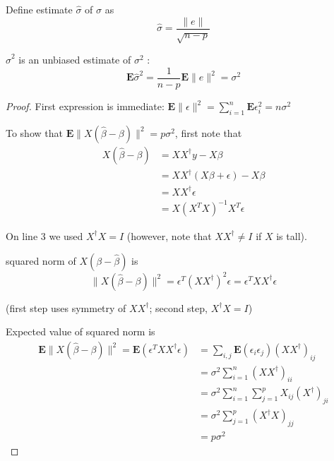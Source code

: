 \begin{definition}
    Define estimate $ \hat{\sigma} $ of $ \sigma $ as
\begin{equation}
\hat{\sigma}=\frac{\|e\|}{\sqrt{n-p}}
\end{equation}
\end{definition}

\begin{theorem}
    $ \hat{\sigma}^{2} $ is an unbiased estimate of $ \sigma^{2} $ :
\begin{equation}
\mathbf{E} \hat{\sigma}^{2}=\frac{1}{n-p} \mathbf{E}\|e\|^{2}=\sigma^{2}
\end{equation}
\end{theorem}


\begin{proof}
    First expression is immediate: $ \mathbf{E}\|\epsilon\|^{2}=\sum_{i=1}^{n} \mathbf{E} \epsilon_{i}^{2}=n \sigma^{2} $

    To show that $ \mathbf{E}\|X(\hat{\beta}-\beta)\|^{2}=p \sigma^{2} $, first note that
\begin{equation}
\begin{aligned}
X(\hat{\beta}-\beta) &=X X^{\dagger} y-X \beta \\
&=X X^{\dagger}(X \beta+\epsilon)-X \beta \\
&=X X^{\dagger} \epsilon \\
&=X\left(X^{T} X\right)^{-1} X^{T} \epsilon
\end{aligned}
\end{equation}

On line 3 we used $ X^{\dagger} X=I $ (however, note that $ X X^{\dagger} \neq I $ if $ X $ is tall).

\begin{theorem}
    squared norm of $ X(\beta-\hat{\beta}) $ is
\begin{equation}
\|X(\hat{\beta}-\beta)\|^{2}=\epsilon^{T}\left(X X^{\dagger}\right)^{2} \epsilon=\epsilon^{T} X X^{\dagger} \epsilon
\end{equation}

(first step uses symmetry of $ X X^{\dagger} $; second step, $ X^{\dagger} X=I $)
\end{theorem}



Expected value of squared norm is
\begin{equation}
\begin{aligned}
\mathbf{E}\|X(\hat{\beta}-\beta)\|^{2}=\mathbf{E}\left(\epsilon^{T} X X^{\dagger} \epsilon\right) &=\sum_{i, j} \mathbf{E}\left(\epsilon_{i} \epsilon_{j}\right)\left(X X^{\dagger}\right)_{i j} \\
&=\sigma^{2} \sum_{i=1}^{n}\left(X X^{\dagger}\right)_{i i} \\
&=\sigma^{2} \sum_{i=1}^{n} \sum_{j=1}^{p} X_{i j}\left(X^{\dagger}\right)_{j i} \\
&=\sigma^{2} \sum_{j=1}^{p}\left(X^{\dagger} X\right)_{j j} \\
&=p \sigma^{2}
\end{aligned}
\end{equation}


\end{proof}
